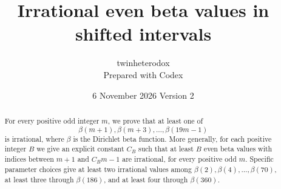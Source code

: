 \documentclass[11pt]{article}
\title{\Large Irrational even beta values in shifted intervals}
\author{twinheterodox\\[2pt]\normalsize Prepared with Codex}
\date{6 November 2026 \quad Version 2}
\theoremstyle{remark}
\numberwithin{equation}{section}
\begin{document}
\maketitle
\begin{abstract}
For every positive odd integer $m$, we prove that at least one of
\[
 \beta(m+1),\beta(m+3),\ldots,\beta(19m-1)
\]
is irrational, where $\beta$ is the Dirichlet beta function.
More generally, for each positive integer $B$ we give an explicit
constant $C_B$ such that at least $B$ even beta values with indices
between $m+1$ and $C_Bm-1$ are irrational, for every positive odd $m$.
Specific parameter choices give at least two irrational values among
$\beta(2),\beta(4),\ldots,\beta(70)$, at least three through
$\beta(186)$, and at least four through $\beta(360)$.
\end{abstract}








\appendix



\end{document}

